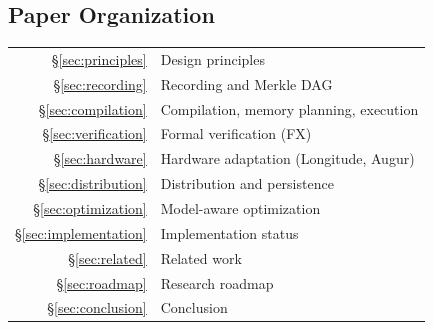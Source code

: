 \subsection{Paper Organization}

\begin{tabular}{@{}rl@{}}
\S\ref{sec:principles} & Design principles \\
\S\ref{sec:recording} & Recording and Merkle DAG \\
\S\ref{sec:compilation} & Compilation, memory planning, execution \\
\S\ref{sec:verification} & Formal verification (FX) \\
\S\ref{sec:hardware} & Hardware adaptation (Longitude, Augur) \\
\S\ref{sec:distribution} & Distribution and persistence \\
\S\ref{sec:optimization} & Model-aware optimization \\
\S\ref{sec:implementation} & Implementation status \\
\S\ref{sec:related} & Related work \\
\S\ref{sec:roadmap} & Research roadmap \\
\S\ref{sec:conclusion} & Conclusion \\
\end{tabular}
